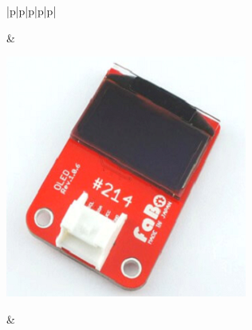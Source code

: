 \begin{table}[H]
\begin{tabular}{|p{\colA}|p{\colB}|p{\colC}|p{\colD}|p{\colE}|}
\begin{minipage}[t]{\linewidth}
	\end{minipage} & 
    \begin{minipage}[t]{\linewidth}
    \smallskip
      \centering
      \includegraphics[width=0.8\linewidth]{images/chap05/text05-img025.png}
      \smallskip
    \end{minipage} &
    \pageref{oled}\\ \hline
    \end{tabular}
\end{table}

